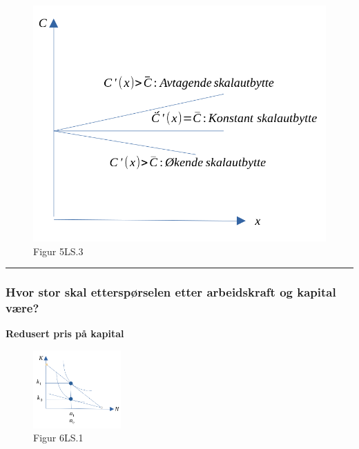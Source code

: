 \documentclass[
  letterpaper,
  DIV=11,
  numbers=noendperiod]{scrartcl}
\begin{document}
\begin{figure}[H]

{\centering \includegraphics[width=1\textwidth,height=\textheight]{drawio/til_lang.png}

}

\caption{Figur 5LS.3}

\end{figure}%

\begin{center}\rule{0.5\linewidth}{0.5pt}\end{center}

\subsubsection{Hvor stor skal etterspørselen etter arbeidskraft og
kapital
være?}\label{hvor-stor-skal-etterspuxf8rselen-etter-arbeidskraft-og-kapital-vuxe6re}

\textbf{Redusert pris på kapital}

\begin{figure}[H]

{\centering \includegraphics[width=0.3\textwidth,height=\textheight]{drawio/kosminkk.png}

}

\caption{Figur 6LS.1}

\end{figure}%
\end{document}
